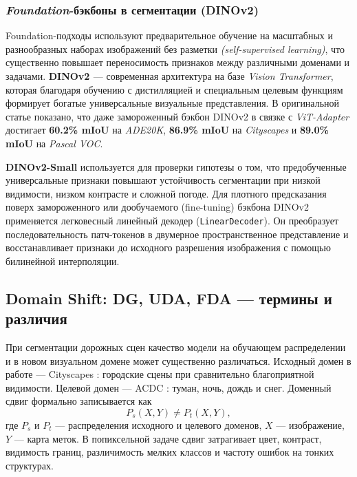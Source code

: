 \documentclass[14pt,a4paper]{extarticle}
\begin{document}
\subsubsection{\textit{Foundation}-бэкбоны в сегментации (DINOv2)}
Foundation-подходы используют предварительное обучение на масштабных и разнообразных наборах изображений без разметки \textit{(self-supervised learning)}, что существенно повышает переносимость признаков между различными доменами и задачами. \textbf{DINOv2 \cite{oquab2023dinov2}} --- современная архитектура на базе \textit{Vision Transformer}, которая благодаря обучению с дистилляцией и специальным целевым функциям формирует богатые универсальные визуальные представления. В оригинальной статье показано, что даже замороженный бэкбон DINOv2 в связке с \textit{ViT-Adapter} достигает \textbf{60.2\% mIoU} на \textit{ADE20K}, \textbf{86.9\% mIoU} на \textit{Cityscapes} и \textbf{89.0\% mIoU} на \textit{Pascal VOC}.

\textbf{DINOv2-Small} используется для проверки гипотезы о том, что предобученные универсальные признаки повышают устойчивость сегментации при низкой видимости, низком контрасте и сложной погоде. Для плотного предсказания поверх замороженного или дообучаемого (fine-tuning) бэкбона DINOv2 применяется легковесный линейный декодер (\texttt{LinearDecoder}). Он преобразует последовательность патч-токенов в двумерное пространственное представление и восстанавливает признаки до исходного разрешения изображения с помощью билинейной интерполяции.

\subsection{Domain Shift: DG, UDA, FDA --- термины и различия}

При сегментации дорожных сцен качество модели на обучающем распределении и в новом визуальном домене может существенно различаться. Исходный домен в работе --- Cityscapes \cite{cordts2016cityscapes}: городские сцены при сравнительно благоприятной видимости. Целевой домен --- ACDC \cite{sakaridis2021acdc}: туман, ночь, дождь и снег. Доменный сдвиг формально записывается как
\begin{equation}
    P_s(X, Y) \neq P_t(X, Y),
\end{equation}
где $P_s$ и $P_t$ --- распределения исходного и целевого доменов, $X$ --- изображение, $Y$ --- карта меток. В попиксельной задаче сдвиг затрагивает цвет, контраст, видимость границ, различимость мелких классов и частоту ошибок на тонких структурах.
\end{document}
